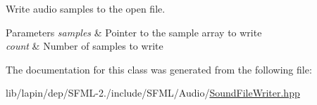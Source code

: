 Write audio samples to the open file. 


\begin{DoxyParams}{Parameters}
{\em samples} & Pointer to the sample array to write \\
\hline
{\em count} & Number of samples to write \\
\hline
\end{DoxyParams}


The documentation for this class was generated from the following file\-:\begin{DoxyCompactItemize}
\item 
lib/lapin/dep/\-S\-F\-M\-L-\/2./include/\-S\-F\-M\-L/\-Audio/\hyperlink{lapin_2dep_2_s_f_m_l-2_83_2include_2_s_f_m_l_2_audio_2_sound_file_writer_8hpp}{Sound\-File\-Writer.\-hpp}\end{DoxyCompactItemize}
